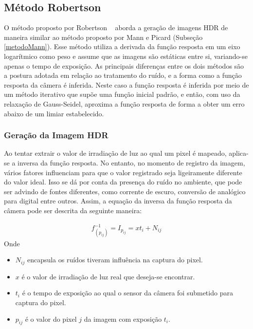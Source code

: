 \subsection{Método Robertson} \label{metodoRobertson}

O método proposto por Robertson \etal~\cite{robertson} aborda a geração de imagens HDR de maneira similar ao método proposto por Mann e Picard (Subseção \ref{metodoMann}). Esse método utiliza a derivada da função resposta em um eixo logarítmico como peso e assume que as imagens são estáticas entre si, variando-se apenas o tempo de exposição. As principais diferenças entre os dois métodos são a postura adotada em relação ao tratamento do ruído, e a forma como a função resposta da câmera é inferida. Neste caso a função resposta é inferida por meio de um método iterativo que supõe uma função inicial padrão, e então, com uso da relaxação de Gauss-Seidel, aproxima a função resposta de forma a obter um erro abaixo de um limiar estabelecido.

\subsubsection{Geração da Imagem HDR} \label{metodoRobertsonGeracao}

Ao tentar extrair o valor de irradiação de luz ao qual um pixel é mapeado, aplica-se a inversa da função resposta. No entanto, no momento de registro da imagem, vários fatores influenciam para que o valor registrado seja ligeiramente diferente do valor ideal. Isso se dá por conta da presença do ruído no ambiente, que pode ser advindo de fontes diferentes, como corrente de escuro, conversão de analógico para digital entre outros. Assim, a equação da inversa da função resposta da câmera pode ser descrita da seguinte maneira:

\begin{align} \label{eqRobertsonIFR}
	f_{(p_{ij})}^{-1} = I_{p_{ij}} = xt_{i} + N_{ij}
\end{align}
Onde
\begin{itemize}
\item $N_{ij}$ encapsula os ruídos tiveram influência na captura do pixel.
\item $x$ é o valor de irradiação de luz real que deseja-se encontrar.
\item $t_{i}$ é o tempo de exposição ao qual o sensor da câmera foi submetido para captura do pixel.
\item $p_{ij}$ é o valor do pixel $j$ da imagem com exposição $t_{i}$.
\end{itemize}


